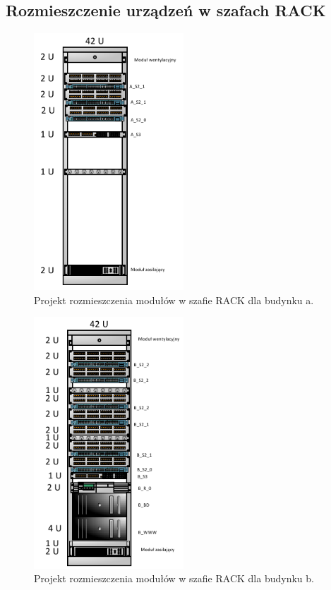 \documentclass{report}
\begin{document}
\subsection{Rozmieszczenie urządzeń w szafach RACK}

\begin{figure}[H]
  \centering
      \includegraphics[width=0.5\textwidth]{./obrazki/rack/a.png}
  \caption{Projekt rozmieszczenia modułów w szafie RACK dla budynku a.}
\end{figure}

\begin{figure}[H]
  \centering
      \includegraphics[width=0.5\textwidth]{./obrazki/rack/b.png}
  \caption{Projekt rozmieszczenia modułów w szafie RACK dla budynku b.}
\end{figure}
\end{document}
